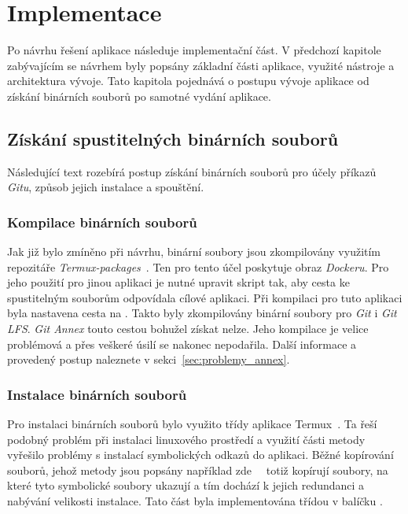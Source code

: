 \chapter{Implementace}
Po návrhu řešení aplikace následuje implementační část. V předchozí kapitole zabývajícím se návrhem byly popsány základní části aplikace, využité nástroje a architektura vývoje. Tato kapitola pojednává o postupu vývoje aplikace od získání binárních souborů po samotné vydání aplikace.

\section{Získání spustitelných binárních souborů}
Následující text rozebírá postup získání binárních souborů pro účely příkazů \emph{Gitu}, způsob jejich instalace a spouštění.

    \subsection{Kompilace binárních souborů}
    Jak již bylo zmíněno při návrhu, binární soubory jsou zkompilovány využitím repozitáře \emph{Termux-packages}~. Ten pro tento účel poskytuje obraz \emph{Dockeru}. Pro jeho použití pro jinou aplikaci je nutné upravit skript  tak, aby cesta ke spustitelným souborům odpovídala cílové aplikaci. Při kompilaci pro tuto aplikaci byla nastavena cesta  na . Takto byly zkompilovány binární soubory pro \emph{Git} i \emph{Git LFS}. \emph{Git Annex} touto cestou bohužel získat nelze. Jeho kompilace je velice problémová a přes veškeré úsilí se nakonec nepodařila. Další informace a provedený postup naleznete v sekci~\ref{sec:problemy_annex}.

    \subsection{Instalace binárních souborů}
    Pro instalaci binárních souborů bylo využito třídy  aplikace Termux~. Ta řeší podobný problém při instalaci linuxového prostředí a využití části metody  vyřešilo problémy s instalací symbolických odkazů do aplikaci. Běžné kopírování souborů, jehož metody jsou popsány například zde~~ totiž kopírují soubory, na které tyto symbolické soubory ukazují a tím dochází k jejich redundanci a nabývání velikosti instalace. Tato část byla implementována třídou  v balíčku .

